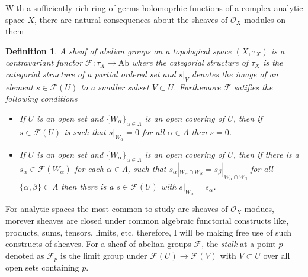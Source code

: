 \documentclass[12pt,twoside,a4paper]{report}
\newtheorem{definition}{Definition}[section]
\newcommand{\osheaf}{\ensuremath{\mathcal O }}
\newcommand{\fsheaf}{\ensuremath{\mathcal F }}
\begin{document}
  With a sufficiently rich ring of germs holomoprhic functions of a complex analytic space $X$, there are natural consequences about the sheaves of $\osheaf_X$-modules on them
  \begin{definition}
    A sheaf of abelian groups on a topological space $(X,\tau_X)$ is a contravariant functor $\fsheaf:\tau_X\to\mathrm{Ab}$ where the categorial structure of $\tau_X$ is the categorial structure of a partial ordered set and $s|_V$ denotes the image of an element $s\in\fsheaf(U)$ to a smaller subset $V\subset U$. Furthemore $\fsheaf$ satifies the following conditions

    \begin{itemize}
    \item If $U$ is an open set and $\{W_{\alpha}\}_{\alpha\in\Lambda}$ is an open covering of $U$, then if $s\in\fsheaf(U)$ is such that $s|_{W_{\alpha}}=0$ for all $\alpha\in\Lambda$ then $s=0$.       
    \item If $U$ is an open set and $\{W_{\alpha}\}_{\alpha\in\Lambda}$ is an open covering of $U$, then if there is a $s_{\alpha}\in\fsheaf(W_{\alpha})$ for each $\alpha\in\Lambda$, such that $s_{\alpha}|_{W_{\alpha}\cap W_{\beta}}=s_{\beta}|_{W_{\alpha}\cap W_{\beta}}$ for all $\{\alpha,\beta\}\subset\Lambda$ then there is a $s\in\fsheaf(U)$ with $s|_{W_{\alpha}}=s_{\alpha}$. 
    \end{itemize}
    \end{definition}
    For analytic spaces the most common to study are sheaves of $\osheaf_X$-modues, morever sheaves are closed under common algebraic functorial constructs like, products, sums, tensors, limits, etc, therefore, I will be making free use of such constructs of sheaves. For a sheaf of abelian groups
    $\fsheaf$, the \emph{stalk} at a point $p$ denoted as $\fsheaf_p$ is the limit group under $\fsheaf(U)\to\fsheaf(V)$ with $V\subset U$ over all open sets containing $p$.
\end{document}
